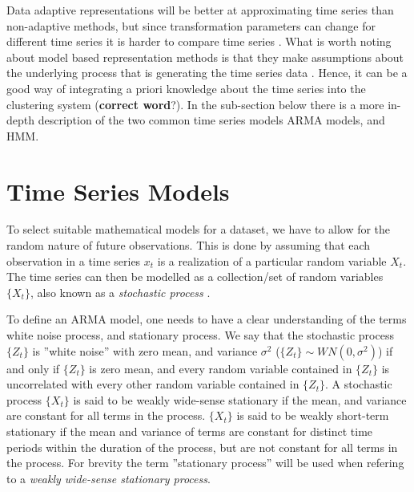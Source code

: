Data adaptive representations will be better at approximating time series than non-adaptive methods, but since transformation parameters can change for different time series it is harder to compare time series \cite{tsc_rev}. What is worth noting about model based representation methods is that they make assumptions about the underlying process that is generating the time series data \cite{ts_data_mining}. Hence, it can be a good way of integrating a priori knowledge about the time series into the clustering system (\textbf{correct word}?). %
In the sub-section below there is a more in-depth description of the two common time series models ARMA models, and HMM. %

\section{Time Series Models}
To select suitable mathematical models for a dataset, we have to allow for the random nature of future observations. This is done by assuming that each observation in a time series $x_t$ is a realization of a particular random variable $X_t$. The time series can then be modelled as a collection/set of random variables $\{X_t\}$, also known as a \textit{stochastic process} \cite{brockwell_davis_advanced}. \newline

To define an ARMA model, one needs to have a clear understanding of the terms white noise process, and stationary process. We say that the stochastic process $\{Z_t\}$ is ''white noise'' with zero mean, and variance $\sigma^2$ ($\{Z_t\} \sim WN(0, \sigma^2)$) if and only if $\{Z_t\}$ is zero mean, and every random variable contained in $\{Z_t\}$ is uncorrelated with every other random variable contained in $\{Z_t\}$. %
A stochastic process $\{X_t\}$ is said to be weakly wide-sense stationary if the mean, and variance are constant for all terms in the process. $\{X_t\}$ is said to be weakly short-term stationary if the mean and variance of terms are constant for distinct time periods within the duration of the process, but are not constant for all terms in the process. For brevity the term ''stationary process'' will be used when refering to a \textit{weakly wide-sense stationary process}. 

